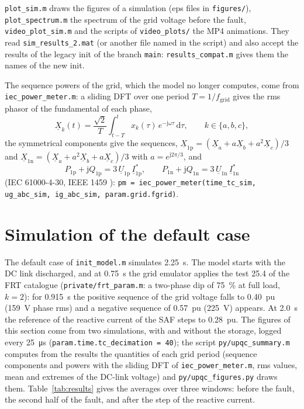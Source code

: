 \documentclass[11pt,a4paper]{scrartcl}
\newcommand{\ped}[1]{_{\mathrm{#1}}}
\newcommand{\code}[1]{\texttt{#1}}
\newcommand{\jj}{\mathrm{j}}
\begin{document}
\begin{onehalfspace}
\code{plot\_sim.m} draws the figures of a simulation (eps files in \code{figures/}), \code{plot\_spectrum.m} the spectrum of the grid voltage before the fault, \code{video\_plot\_sim.m} and the scripts of \code{video\_plots/} the MP4 animations. They read \code{sim\_results\_2.mat} (or another file named in the script) and also accept the results of the legacy init of the branch \code{main}: \code{results\_compat.m} gives them the names of the new init.

The sequence powers of the grid, which the model no longer computes, come from \code{iec\_power\_meter.m}: a sliding DFT over one period $T = 1/f\ped{grid}$ gives the rms phasor of the fundamental of each phase,
\begin{equation}
	\underline{X}_k(t) = \frac{\sqrt{2}}{T}\int_{t-T}^{t} x_k(\tau)\,e^{-\jj\omega\tau}\,\mathrm{d}\tau, \qquad k \in \{a, b, c\},
\end{equation}
the symmetrical components give the sequences, $\underline{X}\ped{1p} = (\underline{X}_a + a\underline{X}_b + a^2\underline{X}_c)/3$ and $\underline{X}\ped{1n} = (\underline{X}_a + a^2\underline{X}_b + a\underline{X}_c)/3$ with $a = e^{\jj 2\pi/3}$, and
\begin{equation}
	P\ped{1p} + \jj Q\ped{1p} = 3\,\underline{U}\ped{1p}\,\underline{I}\ped{1p}^*, \qquad P\ped{1n} + \jj Q\ped{1n} = 3\,\underline{U}\ped{1n}\,\underline{I}\ped{1n}^*
\end{equation}
(IEC 61000-4-30, IEEE 1459 \cite{iec61000430,ieee1459}): \code{pm = iec\_power\_meter(time\_tc\_sim, ug\_abc\_sim, ig\_abc\_sim, param.grid.fgrid)}.

\section{Simulation of the default case}
\label{sec:results}

The default case of \code{init\_model.m} simulates \SI{2.25}{s}. The model starts with the DC link discharged, and at \SI{0.75}{s} the grid emulator applies the test 25.4 of the FRT catalogue (\code{private/frt\_param.m}: a two-phase dip of \SI{75}{\percent} at full load, $k = 2$): for \SI{0.915}{s} the positive sequence of the grid voltage falls to \SI{0.40}{pu} (\SI{159}{V} phase rms) and a negative sequence of \SI{0.57}{pu} (\SI{225}{V}) appears. At \SI{2.0}{s} the reference of the reactive current of the SAF steps to \SI{0.28}{pu}. The figures of this section come from two simulations, with and without the storage, logged every \SI{25}{\micro\second} (\code{param.time.tc\_decimation = 40}); the script \code{py/upqc\_summary.m} computes from the results the quantities of each grid period (sequence components and powers with the sliding DFT of \code{iec\_power\_meter.m}, rms values, mean and extremes of the DC-link voltage) and \code{py/upqc\_figures.py} draws them. Table~\ref{tab:results} gives the averages over three windows: before the fault, the second half of the fault, and after the step of the reactive current.


\end{onehalfspace}
\end{document}
